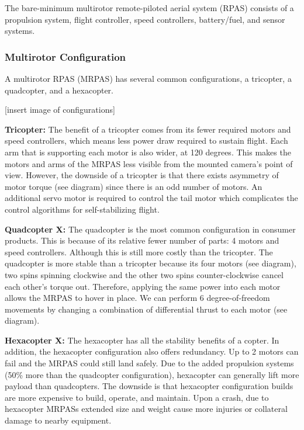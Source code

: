 The bare-minimum multirotor remote-piloted aerial system (RPAS) consists of a propulsion system, flight controller, speed controllers, battery/fuel, and sensor systems.

\subsubsection{Multirotor Configuration}

A multirotor RPAS (MRPAS) has several common configurations, a tricopter, a quadcopter, and a hexacopter.

[insert image of configurations]

\textbf{Tricopter: }The benefit of a tricopter comes from its fewer required motors and speed controllers, 
which means less power draw required to sustain flight. Each arm that is supporting each motor is also wider, at 120 
degrees. This makes the motors and arms of the MRPAS less visible from the mounted camera's point of view. 
However, the downside of a tricopter is that there exists asymmetry of motor torque (see diagram) since 
there is an odd number of motors. An additional servo motor is required to control the tail motor which 
complicates the control algorithms for self-stabilizing flight.

\textbf{Quadcopter X: }
The quadcopter is the most common configuration in consumer products. This is because of its relative fewer 
number of parts: 4 motors and speed controllers. Although this is still more costly than the tricopter. The 
quadcopter is more stable than a tricopter because its four motors (see diagram), two spins spinning 
clockwise and the other two spins counter-clockwise cancel each other’s torque out. Therefore, applying the 
same power into each motor allows the MRPAS to hover in place. We can perform 6 degree-of-freedom movements 
by changing a combination of differential thrust to each motor (see diagram).

\textbf{Hexacopter X: }
The hexacopter has all the stability benefits of a copter. In addition, the hexacopter configuration also 
offers redundancy. Up to 2 motors can fail and the MRPAS could still land safely. Due to the added 
propulsion systems (50\% more than the quadcopter configuration), hexacopter can generally lift more 
payload than quadcopters. The downside is that hexacopter configuration builds are more expensive to build, 
operate, and maintain. Upon a crash, due to hexacopter MRPASs extended size and weight cause more injuries 
or collateral damage to nearby equipment.

